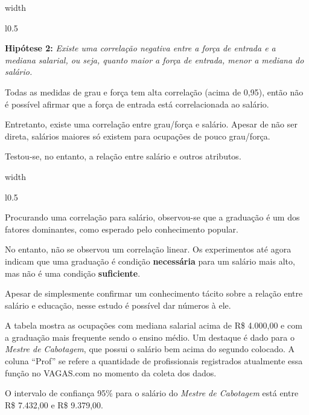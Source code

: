 \documentclass[10pt,a4paper,final]{article}
\newcommand\disappearingrule{%
  \par %
  \vskip10pt %
  \leaders\vrule width \textwidth\vskip0.4pt %
  \nointerlineskip %
  \vskip10pt %
}
\begin{document}
\disappearingrule

\begin{minipage}[t][18\baselineskip]{\linewidth}
  \begin{wrapfigure}{l}{0.5\textwidth}
  \end{wrapfigure}
  
  \textbf{Hipótese 2:} \textit{Existe uma correlação negativa entre a força de entrada e a mediana salarial, ou seja, quanto maior a força de entrada, menor a mediana do salário.}
  
  Todas as medidas de grau e força tem alta correlação (acima de 0,95), então não é possível afirmar que a força de entrada está correlacionada ao salário.
  
  Entretanto, existe uma correlação entre grau/força e salário. Apesar de não ser direta, salários maiores só existem para ocupações de pouco grau/força.
  
  Testou-se, no entanto, a relação entre salário e outros atributos.
\end{minipage}

\disappearingrule

\begin{minipage}[t]{\linewidth}
  \begin{wrapfigure}{l}{0.5\textwidth}
  \end{wrapfigure}

  Procurando uma correlação para salário, observou-se que a graduação é um dos fatores dominantes, como esperado pelo conhecimento popular.
  
  No entanto, não se observou um correlação linear. Os experimentos até agora indicam que uma graduação é condição \textbf{necessária} para um salário mais alto, mas não é uma condição \textbf{suficiente}.
  
  Apesar de simplesmente confirmar um conhecimento tácito sobre a relação entre salário e educação, nesse estudo é possível dar números à ele.
  
  A tabela mostra as ocupações com mediana salarial acima de R\$ 4.000,00 e com a graduação mais frequente sendo o ensino médio. Um destaque é dado para o \textit{Mestre de Cabotagem}, que possui o salário bem acima do segundo colocado. A coluna \enquote{Prof} se refere a quantidade de profissionais registrados atualmente essa função no VAGAS.com no momento da coleta dos dados.
  
  O intervalo de confiança 95\% para o salário do \textit{Mestre de Cabotagem} está entre R\$ 7.432,00 e  R\$ 9.379,00.
\end{minipage}
\end{document}
